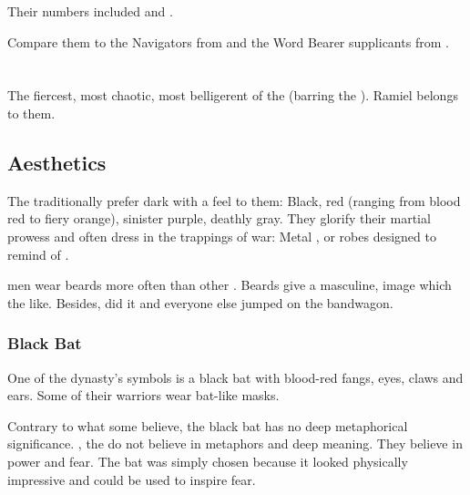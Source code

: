 Their numbers included  and . 

Compare them to the Navigators from \cite{FrankHerbert:Dune} and the Word Bearer supplicants from \cite{BenCounter:BattlefortheAbyss}.















\section[Mystraacht]{\Mystraacht}
The fiercest, most chaotic, most belligerent of the \resphain{} (barring the ). Ramiel belongs to them. 









\subsection{Aesthetics}
The \Mystraacht{} traditionally prefer dark \colours with a  feel to them: 
Black, red (ranging from blood red to fiery orange), sinister purple, deathly gray. 
They glorify their martial prowess and often dress in the trappings of war: 
Metal \armour, or robes designed to remind of \armour. 

\Mystraacht{} men wear beards more often than other \resphain. 
Beards give a masculine,  image which the \Mystraacht{} like. 
Besides, \Zachirah{} did it and everyone else jumped on the bandwagon. 





\subsubsection{Black Bat}
One of the dynasty's symbols is a black bat with blood-red fangs, eyes, claws and ears. Some of their warriors wear bat-like masks. 

Contrary to what some believe, the black bat has no deep metaphorical significance. 
, the \Mystraacht{} do not believe in metaphors and deep meaning. 
They believe in power and fear. 
The bat was simply chosen because it looked physically impressive and could be used to inspire fear.

